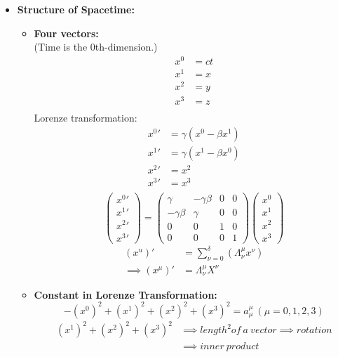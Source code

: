 \documentclass[fleqn,a4paper,12pt]{article}
\begin{document}
\begin{itemize}
  \item 
    \textbf{Structure of Spacetime: }

    \begin{itemize}
    \item 
      \textbf{Four vectors:}\\
      (Time is the 0th-dimension.)
      \begin{align*}
        x^0  &= ct \\
        x^1 &= x  \\
        x^2 &= y \\
        x^3 &= z \\
      \end{align*}
      Lorenze transformation:
      \begin{align*}
        {x^0}' &= \gamma ( x^0 - \beta x^1 ) \\
        {x^1}' &= \gamma (x^1 - \beta x^0 )  \\
        {x^2}' &= x^2 \\
        {x^3}' &= x^3 \\
      \end{align*}
\[
      \begin{pmatrix}
        {x^0}'\\
        {x^1}'\\
        {x^2}'\\
        {x^3}'
      \end{pmatrix}=
      \begin{pmatrix}
        \gamma & -\gamma \beta & 0 & 0\\
        -\gamma \beta & \gamma & 0 & 0\\
        0 & 0 & 1 & 0\\
        0 & 0 & 0 & 1 
      \end{pmatrix}
      \begin{pmatrix}
        x^0\\
        x^1\\
        x^2\\
        x^3
      \end{pmatrix}
\]
      \begin{align*}
        (x^u)' &= \sum_{\nu = 0 }^{\delta} ( \Lambda ^{\mu}_{\nu} x^{\nu} )\\
        \implies (x^\mu)' &= \Lambda ^{\mu}_{\nu} X^{\nu}
      \end{align*}
      \item
        \textbf{Constant in Lorenze Transformation:}\\ 
      \[ -(x^0)^2+(x^1)^2+(x^2)^2 + (x^3)^2 = a_\mu^\mu \  ( \mu=0,1,2,3) \]
      \begin{align*}
        (x^1)^2 + (x^2)^2 + (x^3)^2 &\implies length^2 of\ a\ vector \implies rotation \\
                                    &\implies inner\ product
      \end{align*}


\end{itemize}
\end{itemize}
\end{document}
